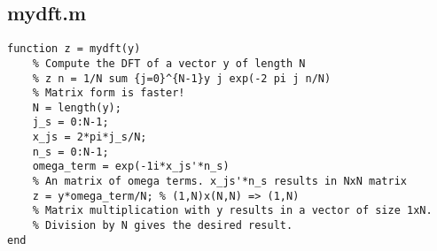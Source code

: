 \subsection{mydft.m}
\label{a:mydft}
\begin{lstlisting}
function z = mydft(y)
    % Compute the DFT of a vector y of length N
    % z n = 1/N sum {j=0}^{N-1}y j exp(-2 pi j n/N)
    % Matrix form is faster!
    N = length(y);
    j_s = 0:N-1;
    x_js = 2*pi*j_s/N;
    n_s = 0:N-1;
    omega_term = exp(-1i*x_js'*n_s)
    % An matrix of omega terms. x_js'*n_s results in NxN matrix
    z = y*omega_term/N; % (1,N)x(N,N) => (1,N)
    % Matrix multiplication with y results in a vector of size 1xN.
    % Division by N gives the desired result.
end
\end{lstlisting}


\clearpage
